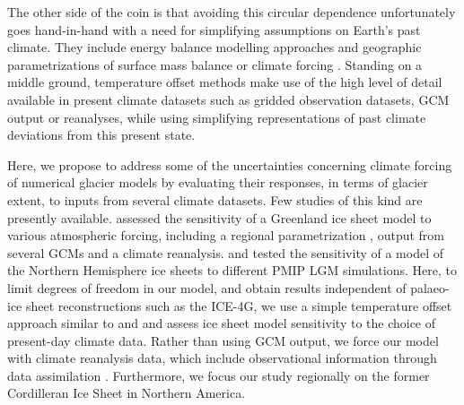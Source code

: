 The other side of the coin is that avoiding this circular dependence unfortunately goes hand-in-hand with a need for simplifying assumptions on Earth's past climate. They include energy balance modelling approaches \citep{tarasov-peltier-1997} and geographic parametrizations of surface mass balance \citep{robert-1991} or climate forcing \citep{johnson-fastook-2002}. Standing on a middle ground, temperature offset methods \citep{greve-etal-1999,bintanja-etal-2005} make use of the high level of detail available in present climate datasets such as gridded observation datasets, GCM output or reanalyses, while using simplifying representations of past climate deviations from this present state.

Here, we propose to address some of the uncertainties concerning climate forcing of numerical glacier models by evaluating their responses, in terms of glacier extent, to inputs from several climate datasets. Few studies of this kind are presently available. \citet{quiquet-etal-2012} assessed the sensitivity of a Greenland ice sheet model to various atmospheric forcing, including a regional parametrization \citep{fausto-etal-2009}, output from several GCMs and a climate reanalysis. \citet{rodgers-etal-2004} and \citet{charbit-etal-2007} tested the sensitivity of a model of the Northern Hemisphere ice sheets to different PMIP LGM simulations. Here, to limit degrees of freedom in our model, and obtain results independent of palaeo-ice sheet reconstructions such as the ICE-4G, we use a simple temperature offset approach similar to \citep{greve-etal-1999} and \citet{bintanja-etal-2005} and assess ice sheet model sensitivity to the choice of present-day climate data. Rather than using GCM output, we force our model with climate reanalysis data, which include observational information through data assimilation \citep{bengtsson-etal-2007}. Furthermore, we focus our study regionally on the former Cordilleran Ice Sheet in Northern America.


